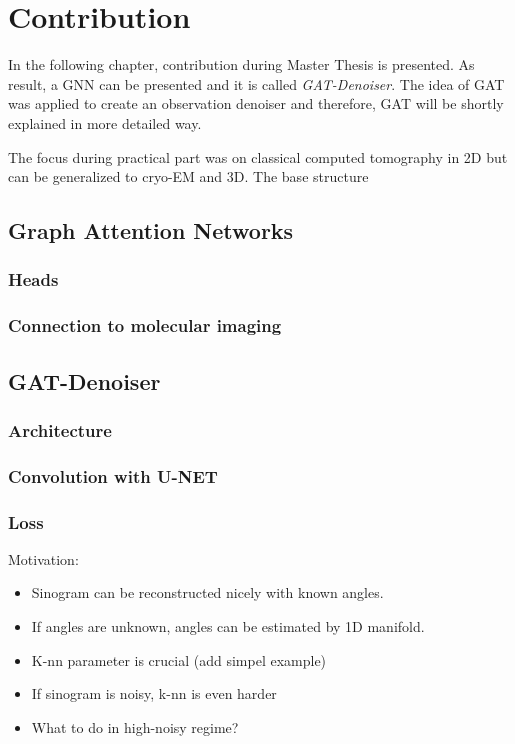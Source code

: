 \chapter{Contribution}
\label{sec:contribution}

In the following chapter, contribution during Master Thesis is presented.
As result, a GNN can be presented and it is called \textit{GAT-Denoiser}.
The idea of GAT was applied to create an observation denoiser and therefore, GAT
will be shortly explained in more detailed way.

The focus during practical part was on classical computed tomography in 2D but
can be generalized to cryo-EM and 3D. The base structure 

\section{Graph Attention Networks}

\subsection{Heads}

\subsection{Connection to molecular imaging}

\section{GAT-Denoiser}
\subsection{Architecture}
\subsection{Convolution with U-NET}
\subsection{Loss}


Motivation:
\begin{itemize}
  \item Sinogram can be reconstructed nicely with known angles.
  \item If angles are unknown, angles can be estimated by 1D manifold.
  \item K-nn parameter is crucial (add simpel example)
  \item If sinogram is noisy, k-nn is even harder
  \item What to do in high-noisy regime?
\end{itemize}

